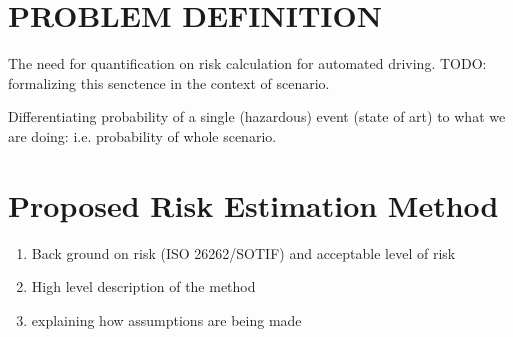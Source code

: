 \documentclass[letterpaper, 10 pt, conference]{ieeeconf}  %
\begin{document}
\section{PROBLEM DEFINITION}\label{sec:problem} %
The need for quantification on risk calculation for automated driving. 
TODO: formalizing this senctence in the context of scenario. 

Differentiating probability of a single (hazardous) event (state of art) to what we are doing: i.e. probability of whole scenario. 

\section{Proposed Risk Estimation Method} %


\begin{enumerate}
	\item Back ground on risk (ISO 26262/SOTIF) and acceptable level of risk
	\item High level description of the method 
	\item explaining how assumptions are being made
\end{enumerate}
\end{document}
